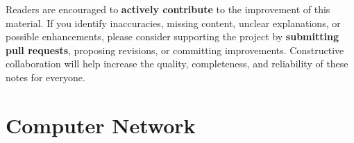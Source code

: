 \documentclass[11pt,a4paper,openany]{report}
\begin{document}
\begin{notebox}
Readers are encouraged to \textbf{actively contribute} to the improvement of this material. If you identify inaccuracies, missing content, unclear explanations, or possible enhancements, please consider supporting the project by \textbf{submitting pull requests}, proposing revisions, or committing improvements. Constructive collaboration will help increase the quality, completeness, and reliability of these notes for everyone.
\end{notebox}
\clearpage
{}
\hypersetup{pageanchor=true}

\setcounter{tocdepth}{2}%
\tableofcontents
\clearpage




\part{Computer Network}


\end{document}
